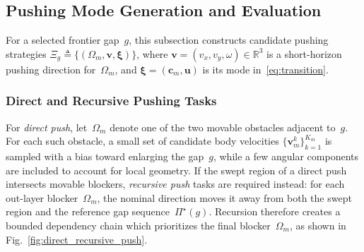 \subsection{Pushing Mode Generation and Evaluation}\label{subsec:push}
For a selected frontier gap~$g$, this subsection constructs candidate
pushing strategies
$\Xi_g\triangleq\{(\Omega_m,\mathbf{v},\boldsymbol{\xi})\}$,
where $\mathbf{v}=(v_x,v_y,\omega)\in\mathbb{R}^3$ is a short-horizon pushing
direction for~$\Omega_m$, and $\boldsymbol{\xi}=(\mathbf{c}_m,\mathbf{u})$
is its mode in~\eqref{eq:transition}.



\subsubsection{Direct and Recursive Pushing Tasks}
For \emph{direct push}, let~$\Omega_m$ denote one of the two movable obstacles adjacent to~$g$. For
each such obstacle, a small set of candidate body velocities
$\{\mathbf{v}_m^k\}_{k=1}^{K_m}$ is sampled with a bias toward enlarging the
gap~$g$, while a few angular components are included to account for local
geometry. If the swept region of a direct push intersects movable blockers,
\emph{recursive push} tasks are required instead: for each out-layer
blocker~$\Omega_m$, the nominal direction moves it away from both the swept
region and the reference gap sequence~$\Pi^\star(g)$. Recursion therefore
creates a bounded dependency chain which prioritizes the final
blocker~$\Omega_m$, as shown in Fig.~\ref{fig:direct_recursive_push}.






